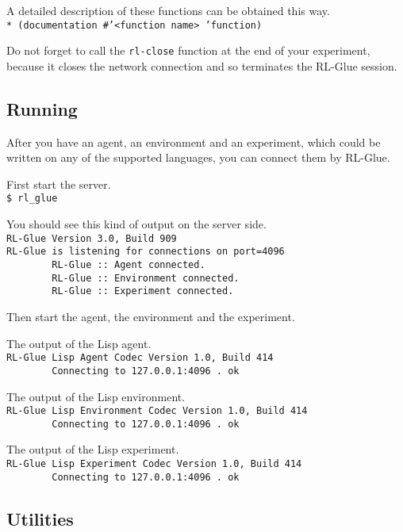 \documentclass[11pt,a4paper,dvipdfm]{article}
\newcommand{\prompttext}[1]{\texttt{#1}}
\newcommand{\shprompt}[1]{\prompttext{\$ #1}}
\newcommand{\lispprompt}[1]{\prompttext{* #1}}
\begin{document}
A detailed description of these functions can be obtained this way. \\
\lispprompt{(documentation \#'<function name> 'function)}

Do not forget to call the \prompttext{rl-close} function at the end of your
experiment, because it closes the network connection and so terminates the
RL-Glue session.

\subsection{Running}

After you have an agent, an environment and an experiment, which could be
written on any of the supported languages, you can connect them by RL-Glue.

First start the server. \\
\shprompt{rl\_glue}

You should see this kind of output on the server side. \\
\prompttext{RL-Glue Version 3.0, Build 909 \\
RL-Glue is listening for connections on port=4096 \\
\mbox{~~~~~~~~}RL-Glue ::~Agent connected. \\
\mbox{~~~~~~~~}RL-Glue ::~Environment connected. \\
\mbox{~~~~~~~~}RL-Glue ::~Experiment connected.}

Then start the agent, the environment and the experiment.

The output of the Lisp agent. \\
\prompttext{RL-Glue Lisp Agent Codec Version 1.0, Build 414 \\
\mbox{~~~~~~~~}Connecting to 127.0.0.1:4096 .~ok}

The output of the Lisp environment. \\
\prompttext{RL-Glue Lisp Environment Codec Version 1.0, Build 414 \\
\mbox{~~~~~~~~}Connecting to 127.0.0.1:4096 .~ok}

The output of the Lisp experiment. \\
\prompttext{RL-Glue Lisp Experiment Codec Version 1.0, Build 414 \\
\mbox{~~~~~~~~}Connecting to 127.0.0.1:4096 .~ok}

\hypertarget{rlutils}{\subsection{Utilities}}
\end{document}
